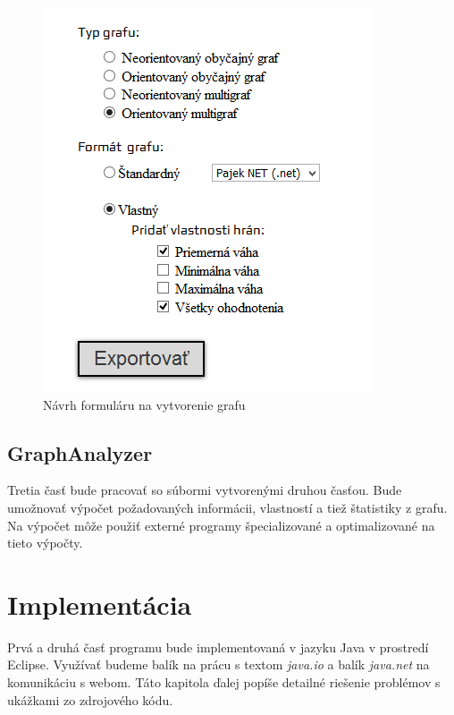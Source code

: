 \documentclass[12pt,twoside,slovak,a4paper]{article}
\begin{document}
	 \begin{figure}[H]
	 \caption{Návrh formuláru na vytvorenie grafu}
	 \includegraphics{gui}
	 \end{figure}
	 
	\subsection{GraphAnalyzer}
	Tretia časť bude pracovať so súbormi vytvorenými druhou časťou. Bude umožnovať výpočet požadovaných informácii, vlastností a tiež štatistiky z grafu. Na výpočet môže použiť externé programy špecializované a optimalizované na tieto výpočty.
	
	\section{Implementácia}
	Prvá a druhá časť programu bude implementovaná v jazyku Java v prostredí Eclipse. Využívať budeme balík na prácu s textom \emph{java.io} a balík \emph{java.net} na komunikáciu s webom. Táto kapitola ďalej popíše detailné riešenie problémov s ukážkami zo zdrojového kódu.
	 

\nocite{*}

\end{document}
